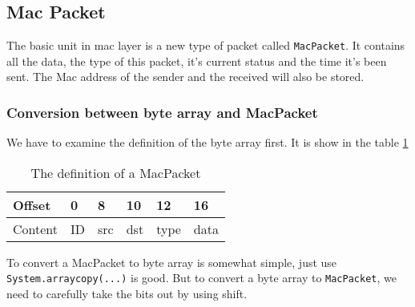 \documentclass[conference,compsoc]{IEEEtran}
\begin{document}
	\subsection{Mac Packet}
		The basic unit in mac layer is a new type of packet called \lstinline{MacPacket}. It contains all the data, the type of this packet, it's current status and the time it's been sent. The Mac address of the sender and the received will also be stored.
		\subsubsection{Conversion between byte array and MacPacket}
			We have to examine the definition of the byte array first. It is show in the table \ref{MacPacket_dataDef}
			\begin{table}[h]
			\begin{tabular}{m{0.5cm}m{2cm}m{0.5cm}m{0.5cm}m{1cm}m{1cm}}\label{MacPacket_dataDef}
				Offset                        & 0                       & 8                        & 10                       & 12                        & 16                        \\ \hline
				\multicolumn{1}{|l|}{Content} & \multicolumn{1}{l|}{ID} & \multicolumn{1}{l|}{src} & \multicolumn{1}{l|}{dst} & \multicolumn{1}{l|}{type} & \multicolumn{1}{l|}{data} \\ \hline
			\end{tabular}
			\caption{The definition of a MacPacket}
			\end{table}
			\par
			To convert a MacPacket to byte array is somewhat simple, just use \lstinline{System.arraycopy(...)} is good. But to convert a byte array to \lstinline{MacPacket}, we need to carefully take the bits out by using shift.
\end{document}
